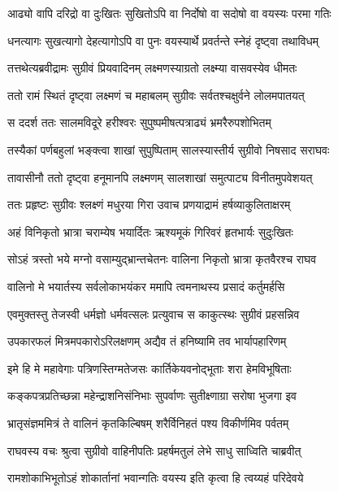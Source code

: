 \twolineshloka
{आढ्यो वापि दरिद्रो वा दुःखितः सुखितोऽपि वा}
{निर्दोषो वा सदोषो वा वयस्यः परमा गतिः} %

\twolineshloka
{धनत्यागः सुखत्यागो देहत्यागोऽपि वा पुनः}
{वयस्यार्थे प्रवर्तन्ते स्नेहं दृष्ट्वा तथाविधम्} %

\twolineshloka
{तत्तथेत्यब्रवीद्रामः सुग्रीवं प्रियवादिनम्}
{लक्ष्मणस्याग्रतो लक्ष्म्या वासवस्येव धीमतः} %

\twolineshloka
{ततो रामं स्थितं दृष्ट्वा लक्ष्मणं च महाबलम्}
{सुग्रीवः सर्वतश्चक्षुर्वने लोलमपातयत्} %

\twolineshloka
{स ददर्श ततः सालमविदूरे हरीश्वरः}
{सुपुष्पमीषत्पत्राढ्यं भ्रमरैरुपशोभितम्} %

\twolineshloka
{तस्यैकां पर्णबहुलां भङ्क्त्वा शाखां सुपुष्पिताम्}
{सालस्यास्तीर्य सुग्रीवो निषसाद सराघवः} %

\twolineshloka
{तावासीनौ ततो दृष्ट्वा हनूमानपि लक्ष्मणम्}
{सालशाखां समुत्पाट्य विनीतमुपवेशयत्} %

\twolineshloka
{ततः प्रहृष्टः सुग्रीवः श्लक्ष्णं मधुरया गिरा}
{उवाच प्रणयाद्रामं हर्षव्याकुलिताक्षरम्} %

\twolineshloka
{अहं विनिकृतो भ्रात्रा चराम्येष भयार्दितः}
{ऋश्यमूकं गिरिवरं हृतभार्यः सुदुःखितः} %

\twolineshloka
{सोऽहं त्रस्तो भये मग्नो वसाम्युद्भ्रान्तचेतनः}
{वालिना निकृतो भ्रात्रा कृतवैरश्च राघव} %

\twolineshloka
{वालिनो मे भयार्तस्य सर्वलोकाभयंकर}
{ममापि त्वमनाथस्य प्रसादं कर्तुमर्हसि} %

\twolineshloka
{एवमुक्तस्तु तेजस्वी धर्मज्ञो धर्मवत्सलः}
{प्रत्युवाच स काकुत्स्थः सुग्रीवं प्रहसन्निव} %

\twolineshloka
{उपकारफलं मित्रमपकारोऽरिलक्षणम्}
{अद्यैव तं हनिष्यामि तव भार्यापहारिणम्} %

\twolineshloka
{इमे हि मे महावेगाः पत्रिणस्तिग्मतेजसः}
{कार्तिकेयवनोद्भूताः शरा हेमविभूषिताः} %

\twolineshloka
{कङ्कपत्रप्रतिच्छन्ना महेन्द्राशनिसंनिभाः}
{सुपर्वाणः सुतीक्ष्णाग्रा सरोषा भुजगा इव} %

\twolineshloka
{भ्रातृसंज्ञममित्रं ते वालिनं कृतकिल्बिषम्}
{शरैर्विनिहतं पश्य विकीर्णमिव पर्वतम्} %

\twolineshloka
{राघवस्य वचः श्रुत्वा सुग्रीवो वाहिनीपतिः}
{प्रहर्षमतुलं लेभे साधु साध्विति चाब्रवीत्} %

\twolineshloka
{रामशोकाभिभूतोऽहं शोकार्तानां भवान्गतिः}
{वयस्य इति कृत्वा हि त्वय्यहं परिदेवये} %

